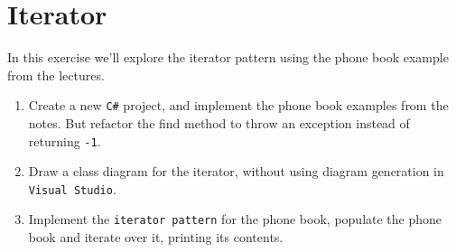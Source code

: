 \documentclass{article}
\newcounter{stepcounter}
\newenvironment{steps}{ 
  \begin{enumerate}[label=\color{red}Step \thesection-\theenumi)]
    \setcounter{enumi}{\value{stepcounter}}
}{
  \setcounter{stepcounter}{\value{enumi}}
  \end{enumerate}
}
\begin{document}
\setcounter{stepcounter}{0}
\pagebreak
\section{Iterator}
In this exercise we'll explore the iterator pattern using the phone book example from the lectures.
\begin{steps}
  \item Create a new \texttt{C\#} project, and implement the phone book examples from the notes. But refactor the find method to throw an exception instead of returning \texttt{-1}.
  \item Draw a class diagram for the iterator, without using diagram generation in \texttt{Visual Studio}.
  \item Implement the \texttt{iterator pattern} for the phone book, populate the phone book and iterate over it, printing its contents.
\end{steps}
\end{document}
